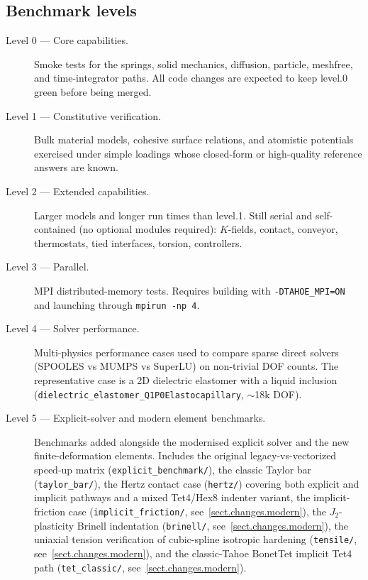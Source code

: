 \subsection{Benchmark levels}
\label{sect.benchmark.levels}
\begin{description}
\item[Level 0 --- Core capabilities.]
Smoke tests for the springs, solid mechanics, diffusion, particle,
meshfree, and time-integrator paths.  All code changes are expected to
keep level.0 green before being merged.
\item[Level 1 --- Constitutive verification.]
Bulk material models, cohesive surface relations, and atomistic
potentials exercised under simple loadings whose closed-form or
high-quality reference answers are known.
\item[Level 2 --- Extended capabilities.]
Larger models and longer run times than level.1.  Still serial and
self-contained (no optional modules required): $K$-fields, contact,
conveyor, thermostats, tied interfaces, torsion, controllers.
\item[Level 3 --- Parallel.]
MPI distributed-memory tests.  Requires building \tahoe with
\texttt{-DTAHOE\_MPI=ON} and launching through
\texttt{mpirun -np 4}.
\item[Level 4 --- Solver performance.]
Multi-physics performance cases used to compare sparse direct solvers
(SPOOLES vs MUMPS vs SuperLU) on non-trivial DOF counts.  The
representative case is a 2D dielectric elastomer with a liquid
inclusion (\texttt{dielectric\_elastomer\_Q1P0Elastocapillary}, $\sim$18k DOF).
\item[Level 5 --- Explicit-solver and modern element benchmarks.]
Benchmarks added alongside the modernised explicit solver and the new
finite-deformation elements.  Includes the original
legacy-vs-vectorized speed-up matrix
(\texttt{explicit\_benchmark/}), the classic Taylor bar
(\texttt{taylor\_bar/}), the Hertz contact case (\texttt{hertz/})
covering both explicit and implicit pathways and a mixed Tet4/Hex8
indenter variant, the implicit-friction case
(\texttt{implicit\_friction/}, see~\ref{sect.changes.modern}), the
$J_{2}$-plasticity Brinell indentation
(\texttt{brinell/}, see~\ref{sect.changes.modern}), the uniaxial
tension verification of cubic-spline isotropic hardening
(\texttt{tensile/}, see~\ref{sect.changes.modern}), and the
classic-Tahoe BonetTet implicit Tet4 path
(\texttt{tet\_classic/}, see~\ref{sect.changes.modern}).
\end{description}

